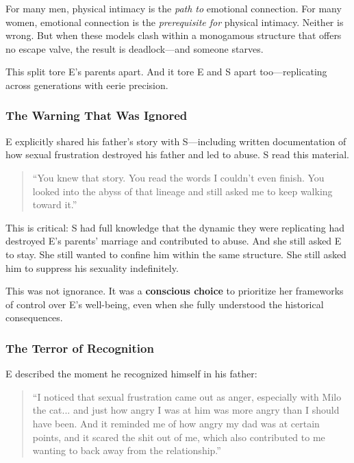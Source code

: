 \documentclass[12pt, letterpaper]{article}
\begin{document}
For many men, physical intimacy is the \textit{path to} emotional connection. For many women, emotional connection is the \textit{prerequisite for} physical intimacy. Neither is wrong. But when these models clash within a monogamous structure that offers no escape valve, the result is deadlock---and someone starves.

This split tore E's parents apart. And it tore E and S apart too---replicating across generations with eerie precision.

\subsubsection{The Warning That Was Ignored}

E explicitly shared his father's story with S---including written documentation of how sexual frustration destroyed his father and led to abuse. S read this material.

\begin{quote}
``You knew that story. You read the words I couldn't even finish. You looked into the abyss of that lineage and still asked me to keep walking toward it.''
\end{quote}

This is critical: S had full knowledge that the dynamic they were replicating had destroyed E's parents' marriage and contributed to abuse. And she still asked E to stay. She still wanted to confine him within the same structure. She still asked him to suppress his sexuality indefinitely.

This was not ignorance. It was a \textbf{conscious choice} to prioritize her frameworks of control over E's well-being, even when she fully understood the historical consequences.

\subsubsection{The Terror of Recognition}

E described the moment he recognized himself in his father:

\begin{quote}
``I noticed that sexual frustration came out as anger, especially with Milo the cat... and just how angry I was at him was more angry than I should have been. And it reminded me of how angry my dad was at certain points, and it scared the shit out of me, which also contributed to me wanting to back away from the relationship.''
\end{quote}
\end{document}

